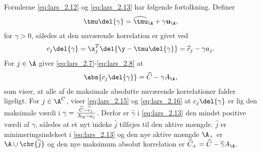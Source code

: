 %
Formlerne \eqref{eq:lars_2.12} og \eqref{eq:lars_2.13} har følgende fortolkning.
Definer
\begin{align}
\tmu \del{\gamma} = \widehat{\tmu}_\A + \gamma \mathbf{u}_\A, \label{eq:lars_2.14}
\end{align}
for \(\gamma > 0\), således at den nuværende korrelation er givet ved
\begin{align}
c_j \del{\gamma} = \x_j^T \del{\y - \tmu \del{\gamma}} = \widehat{c}_j - \gamma a_j. \label{eq:lars_2.15}
\end{align}
For \(j \in \A\) giver \eqref{eq:lars_2.7}-\eqref{eq:lars_2.8} at
\begin{align}
\abs{c_j \del{\gamma}} = \widehat{C} - \gamma A_\A,\label{eq:lars_2.16}
\end{align}
som viser, at alle af de maksimale absolutte nuværende korrelationer falder ligeligt.
For \(j \in \A^C\), viser \eqref{eq:lars_2.15} og \eqref{eq:lars_2.16} at \(c_j \del{\gamma}\) er lig den maksimale værdi i \(\gamma = \frac{\widehat{C} - \widehat{c}_j}{A_\A - a_j}\).
Derfor er \(\widehat{\gamma}\) i \eqref{eq:lars_2.13} den mindst positive værdi af \(\gamma\), således at et nyt indeks \(\widehat{j}\) tilføjes til den aktive mængde.
\(\widehat{j}\) er minimeringsindekset i \eqref{eq:lars_2.13} og den nye aktive mængde \(\A_+\) er \(\A \cup \cbr{\widehat{j}}\) og den nye maksimum absolut korrelation er \(\widehat{C}_+ = \widehat{C}- \widehat{\gamma} A_\A\).
%
%

